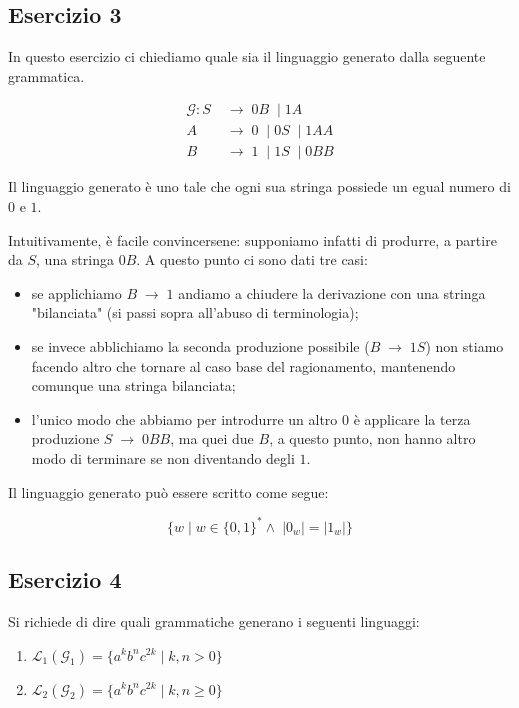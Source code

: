 \documentclass[class=book, crop=false, oneside, 12pt]{standalone}
\begin{document}
\subsection*{Esercizio 3}
In questo esercizio ci chiediamo quale sia il linguaggio generato dalla seguente grammatica.

\begin{align*}
  \mathcal{G}: S\; &\to\; 0B\; \mid 1A \\
  A\; &\to\; 0\; \mid 0S\; \mid 1AA \\
  B\; &\to\; 1\; \mid 1S\; \mid 0BB
\end{align*}

\noindent Il linguaggio generato è uno tale che ogni sua stringa possiede un egual numero di \(0\) e \(1\).

Intuitivamente, è facile convincersene: supponiamo infatti di produrre, a partire da \(S\), una stringa \(0B\). A questo punto ci sono dati tre casi:

\begin{itemize}
  \item se applichiamo \(B\; \to\; 1\) andiamo a chiudere la derivazione con una stringa "bilanciata" (si passi sopra all'abuso di terminologia);
  \item se invece abblichiamo la seconda produzione possibile (\(B\; \to\; 1S\)) non stiamo facendo altro che tornare al caso base del ragionamento, mantenendo comunque una stringa bilanciata;
  \item l'unico modo che abbiamo per introdurre un altro \(0\) è applicare la terza produzione \(S\; \to\; 0BB\), ma quei due \(B\), a questo punto, non hanno altro modo di terminare se non diventando degli \(1\).
\end{itemize}

\noindent Il linguaggio generato può essere scritto come segue:

\begin{equation*}
  \{ w \mid w \in \{0, 1\}^* \land\; |0_w| = |1_w| \}
\end{equation*}

\subsection*{Esercizio 4}
Si richiede di dire quali grammatiche generano i seguenti linguaggi:

\begin{enumerate}
  \item \(\mathcal{L}_1(\mathcal{G}_1) = \{ a^k b^n c^{2k} \mid k, n > 0 \}\)
  \item \(\mathcal{L}_2(\mathcal{G}_2) = \{ a^k b^n c^{2k} \mid k, n \geq 0 \}\)
\end{enumerate}
\end{document}
